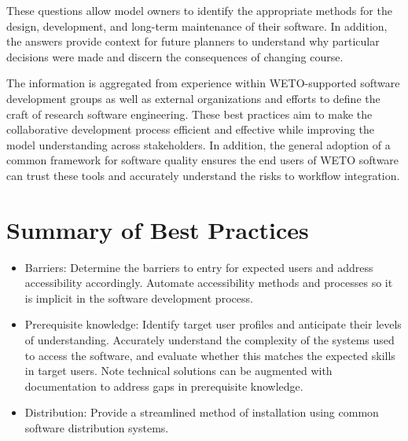 \documentclass[]{nrel}
\begin{document}
These questions allow model owners to identify the appropriate methods for the design, development,
and long-term maintenance of their software. In addition, the answers provide context for future
planners to understand why particular decisions were made and discern the consequences of
changing course.

The information is aggregated from experience within WETO-supported software development
groups as well as external organizations and efforts to define the craft of research software
engineering. These best practices aim to make the collaborative development process efficient
and effective while improving the model understanding across stakeholders. In addition,
the general adoption of a common framework for software quality ensures the end users
of WETO software can trust these tools and accurately understand the risks to workflow integration.


\clearpage
\tableofcontents
\listoffigures

\mainmatter
\pagestyle{fancy}




\chapter{Summary of Best Practices}

\begin{itemize}
\item Barriers: Determine the barriers to entry for expected users and address accessibility accordingly.
Automate accessibility methods and processes so it is implicit in the software
development process.

\item Prerequisite knowledge: Identify target user profiles and anticipate their levels of understanding. Accurately understand the complexity of the systems used to access the software, and evaluate whether this matches the expected skills in target users. Note technical solutions can be augmented with documentation to address gaps in prerequisite knowledge.

\item Distribution: Provide a streamlined method of installation using common software distribution systems.
\end{itemize}
\end{document}
